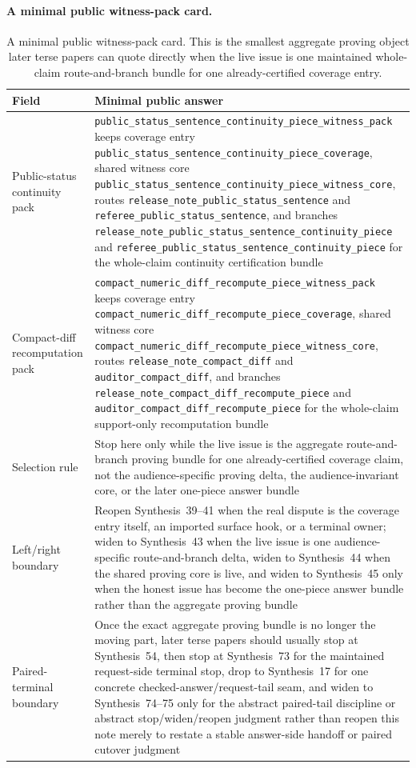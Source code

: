 \documentclass[11pt]{article}
\begin{document}
\paragraph{A minimal public witness-pack card.}
\begin{table}[t]
\centering
\small
\begin{tabularx}{\linewidth}{@{}LY@{}}
\toprule
Field & Minimal public answer \\
\midrule
Public-status continuity pack & \nolinkurl{public_status_sentence_continuity_piece_witness_pack} keeps coverage entry \nolinkurl{public_status_sentence_continuity_piece_coverage}, shared witness core \nolinkurl{public_status_sentence_continuity_piece_witness_core}, routes \nolinkurl{release_note_public_status_sentence} and \nolinkurl{referee_public_status_sentence}, and branches \nolinkurl{release_note_public_status_sentence_continuity_piece} and \nolinkurl{referee_public_status_sentence_continuity_piece} for the whole-claim continuity certification bundle \\
Compact-diff recomputation pack & \nolinkurl{compact_numeric_diff_recompute_piece_witness_pack} keeps coverage entry \nolinkurl{compact_numeric_diff_recompute_piece_coverage}, shared witness core \nolinkurl{compact_numeric_diff_recompute_piece_witness_core}, routes \nolinkurl{release_note_compact_diff} and \nolinkurl{auditor_compact_diff}, and branches \nolinkurl{release_note_compact_diff_recompute_piece} and \nolinkurl{auditor_compact_diff_recompute_piece} for the whole-claim support-only recomputation bundle \\
Selection rule & Stop here only while the live issue is the aggregate route-and-branch proving bundle for one already-certified coverage claim, not the audience-specific proving delta, the audience-invariant core, or the later one-piece answer bundle \\
Left/right boundary & Reopen Synthesis~39--41 when the real dispute is the coverage entry itself, an imported surface hook, or a terminal owner; widen to Synthesis~43 when the live issue is one audience-specific route-and-branch delta, widen to Synthesis~44 when the shared proving core is live, and widen to Synthesis~45 only when the honest issue has become the one-piece answer bundle rather than the aggregate proving bundle \\
Paired-terminal boundary & Once the exact aggregate proving bundle is no longer the moving part, later terse papers should usually stop at Synthesis~54, then stop at Synthesis~73 for the maintained request-side terminal stop, drop to Synthesis~17 for one concrete checked-answer/request-tail seam, and widen to Synthesis~74--75 only for the abstract paired-tail discipline or abstract stop/widen/reopen judgment rather than reopen this note merely to restate a stable answer-side handoff or paired cutover judgment \\
\bottomrule
\end{tabularx}
\caption{A minimal public witness-pack card. This is the smallest aggregate proving object later terse papers can quote directly when the live issue is one maintained whole-claim route-and-branch bundle for one already-certified coverage entry.}
\label{tab:minimal-public-witness-pack-card}
\end{table}
\end{document}
